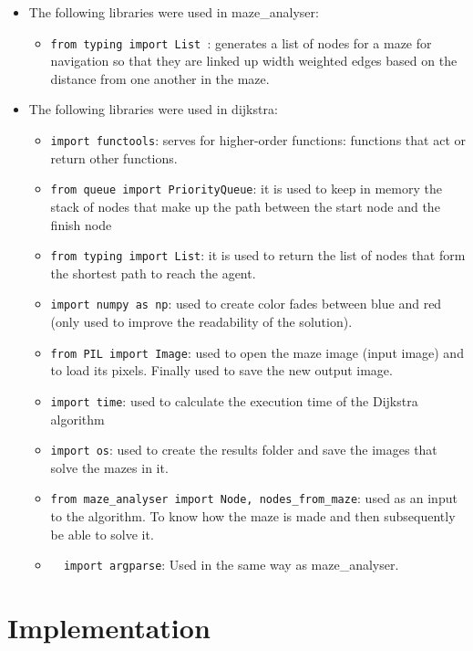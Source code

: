 \begin{itemize}
\begin{itemize}
\end{itemize}
\item The following libraries were used in maze\_analyser:
\begin{itemize}
\item \lstinline {from typing import List }: generates a list of nodes for a maze for navigation so that they are linked up width weighted edges based on the distance from one another in the maze.
\end{itemize}
\item The following libraries were used in dijkstra:
\begin{itemize}

\item \lstinline{import functools}: 
serves for higher-order functions: functions that act or return other functions.
\item  \lstinline{from queue import PriorityQueue}: 
it is used to keep in memory the stack of nodes that make up the path between the start node and the finish node
\item  \lstinline{from typing import List}: 
it is used to return the list of nodes that form the shortest path to reach the agent.

\item \lstinline{import numpy as np}: used to create color fades between blue and red (only used to improve the readability of the solution).
\item  \lstinline{from PIL import Image}: 
used to open the maze image (input image) and to load its pixels. Finally used to save the new output image.
\item  \lstinline{import time}: used to calculate the execution time of the Dijkstra algorithm
\item  \lstinline{import os}: 
used to create the results folder and save the images that solve the mazes in it.

\item  \lstinline{from maze_analyser import Node, nodes_from_maze}: 
used as an input to the algorithm. To know how the maze is made and then subsequently be able to solve it.
\item  \lstinline{  import argparse}: 
Used in the same way as maze\_analyser.
\end{itemize}
\end{itemize}
\section{Implementation}

